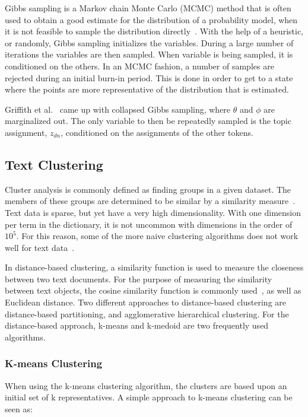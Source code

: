 Gibbs sampling is a Markov chain Monte Carlo (MCMC) method that is often used to obtain a good estimate for the distribution of a probability model, when it is not feasible to sample the distribution directly~\cite{crain2012dimensionality}.
With the help of a heuristic, or randomly, Gibbs sampling initializes the variables.
During a large number of iterations the variables are then sampled.
When variable is being sampled, it is conditioned on the others.
In an MCMC fashion, a number of samples are rejected during an initial burn-in period.
This is done in order to get to a state where the points are more representative of the distribution that is estimated.

Griffith et al\@.~\cite{griffiths2004finding} came up with collapsed Gibbs sampling, where $\theta$ and $\phi$ are marginalized out.
The only variable to then be repeatedly sampled is the topic assignment, $z_{dn}$, conditioned on the assignments of the other tokens.

\subsection{Text Clustering}

Cluster analysis is commonly defined as finding groups in a given dataset.
The members of these groups are determined to be similar by a similarity measure~\cite{kaufman2009finding, aggarwal2012survey}.
Text data is sparse, but yet have a very high dimensionality.
With one dimension per term in the dictionary, it is not uncommon with dimensions in the order of $10^5$.
For this reason, some of the more naive clustering algorithms does not work well for text data~\cite{aggarwal2012survey}.

In distance-based clustering, a similarity function is used to measure the closeness between two text documents.
For the purpose of measuring the similarity between text objects, the cosine similarity function is commonly used~\cite{aggarwal2012survey}, as well as Euclidean distance.
Two different approaches to distance-based clustering are distance-based partitioning, and agglomerative hierarchical clustering.
For the distance-based approach, k-means and k-medoid are two frequently used algorithms.

\subsubsection{K-means Clustering}\label{sec:k-means}

When using the k-means clustering algorithm, the clusters are based upon an initial set of k representatives.
A simple approach to k-means clustering can be seen as:

